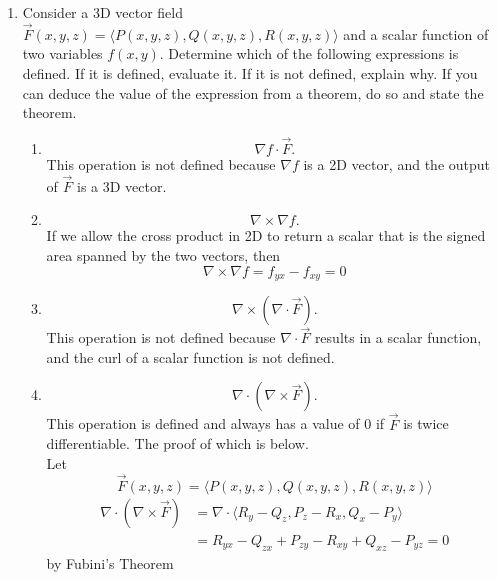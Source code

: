 \begin{enumerate}
	\item Consider a 3D vector field $\vec{F}(x,y,z) = \langle P(x,y,z), Q(x,y,z), R(x,y,z) \rangle$ and a scalar function of two variables $f(x,y)$. Determine which of the following expressions is defined. If it is defined, evaluate it. If it is not defined, explain why. If you can deduce the value of the expression from a theorem, do so and state the theorem.
	\begin{enumerate}[label=\alph*.]
		\item \begin{equation*}
			\nabla f \cdot \vec{F}.
		\end{equation*}
		This operation is not defined because $\nabla f$ is a 2D vector, and the output of $\vec{F}$ is a 3D vector.\\
		
		\item \begin{equation*}
			\nabla \times \nabla f.
		\end{equation*}
		If we allow the cross product in 2D to return a scalar that is the signed area spanned by the two vectors, then
		\begin{equation*}
			\nabla \times \nabla f = f_{yx} - f_{xy} = 0
		\end{equation*}
		
		\item \begin{equation*}
			\nabla\times(\nabla\cdot\vec{F}).
		\end{equation*}
		This operation is not defined because $\nabla \cdot \vec{F}$ results in a scalar function, and the curl of a scalar function is not defined.\\
		
		\item \begin{equation*}
			\nabla \cdot (\nabla \times \vec{F}).
		\end{equation*}
		This operation is defined and always has a value of 0 if $\vec{F}$ is twice differentiable. The proof of which is below.\\
		Let 
		\begin{equation*}
			\vec{F}(x,y,z) = \langle P(x,y,z), Q(x,y,z), R(x,y,z) \rangle
		\end{equation*}
		\begin{align*}
			\nabla \cdot (\nabla \times \vec{F}) &= \nabla \cdot \langle R_y-Q_z, P_z-R_x, Q_x-P_y \rangle \\
			&= R_{yx}-Q_{zx} + P_{zy}-R_{xy} + Q_{xz}-P_{yz} = 0
		\end{align*}
		by Fubini's Theorem\\
	\end{enumerate}


\end{enumerate}
